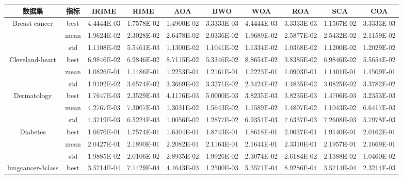 \documentclass{wzuthesis}
\begin{document}
\begin{table}[htbp]
  \centering
    \setlength{\tabcolsep}{3pt} %
    \footnotesize
    \begin{tabular}{cccccccccc}
    \toprule    
    数据集 & 指标 & IRIME & RIME  & AOA   & BWO   & WOA   & ROA   & SCA   & COA \\
    \midrule
    \multirow{3}[0]{*}{Breast-cancer} & best  & 4.4444E-03 & 1.7578E-02 & 1.4900E-02 & 3.3333E-03 & 4.4444E-03 & 3.3333E-03 & 1.1567E-02 & 3.3333E-03 \\
          & mean  & 1.9624E-02 & 2.3028E-02 & 2.6478E-02 & 2.0336E-02 & 1.9689E-02 & 2.5877E-02 & 2.5432E-02 & 2.1159E-02 \\
          & std   & 1.1108E-02 & 5.5461E-03 & 1.1300E-02 & 1.1041E-02 & 1.1334E-02 & 1.0368E-02 & 1.1200E-02 & 1.2029E-02 \\
    \multirow{3}[0]{*}{Cleveland-heart} & best  & 6.9846E-02 & 6.9846E-02 & 8.7115E-02 & 5.3346E-02 & 8.8654E-02 & 3.8385E-02 & 6.9846E-02 & 5.5654E-02 \\
          & mean  & 1.0826E-01 & 1.1486E-01 & 1.2253E-01 & 1.2161E-01 & 1.2223E-01 & 1.0903E-01 & 1.1401E-01 & 1.1509E-01 \\
          & std   & 1.9192E-02 & 3.6574E-02 & 3.3669E-02 & 3.3271E-02 & 2.3424E-02 & 4.4835E-02 & 3.0825E-02 & 3.3782E-02 \\
    \multirow{3}[0]{*}{Dermatology} & best  & 1.7647E-03 & 2.3529E-03 & 4.1176E-03 & 5.0000E-03 & 3.8235E-03 & 3.8235E-03 & 1.4706E-03 & 3.2353E-03 \\
          & mean  & 4.2767E-03 & 7.3007E-03 & 1.3031E-02 & 1.5643E-02 & 1.1589E-02 & 1.4807E-02 & 1.1043E-02 & 6.6417E-03 \\
          & std   & 4.3719E-03 & 6.5224E-03 & 1.0056E-02 & 1.2877E-02 & 6.9351E-03 & 7.6337E-03 & 7.2608E-03 & 5.7978E-03 \\
    \multirow{3}[0]{*}{Diabetes} & best  & 1.6676E-01 & 1.7574E-01 & 1.6404E-01 & 1.8743E-01 & 1.8618E-01 & 2.0037E-01 & 1.9140E-01 & 2.0162E-01 \\
          & mean  & 2.0427E-01 & 2.1890E-01 & 2.2082E-01 & 2.1164E-01 & 2.1644E-01 & 2.3310E-01 & 2.1957E-01 & 2.1669E-01 \\
          & std   & 1.9885E-02 & 2.0106E-02 & 2.8935E-02 & 1.9926E-02 & 2.3074E-02 & 2.6184E-02 & 2.1388E-02 & 1.0460E-02 \\
    \multirow{3}[0]{*}{lungcancer-3class} & best  & 3.5714E-04 & 7.1429E-04 & 4.4643E-03 & 1.2500E-03 & 5.3571E-04 & 8.9286E-04 & 3.5714E-04 & 2.3214E-03 \\

\end{tabular}
\end{table}
\end{document}
